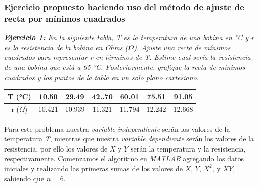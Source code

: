 \documentclass[11pt,letterpaper]{article}
\begin{document}
\subsubsection{Ejercicio propuesto haciendo uso del método de ajuste de recta por mínimos cuadrados}
\begin{center}
\textit{\textbf{Ejercicio 1: } En la siguiente tabla, T es la temperatura de una bobina en °C  y r es la resistencia de la bobina en Ohms ($\Omega$). Ajuste una recta de mínimos cuadrados para representar r en términos de T. Estime cual sería la resistencia de una bobina que está a 65 °C. Posteriormente, grafique la recta de mínimos cuadrados y los puntos de la tabla en un solo plano cartesiano}.\linebreak \par
\begin{tabular}{c|cccccc}
 \hline 
 T (°C) & 10.50 & 29.49 & 42..70 & 60.01 & 75.51 & 91.05 \\ 
 \hline 
 r ($\Omega$) & 10.421 & 10.939 & 11.321 & 11.794 & 12.242 & 12.668 \\ 
 \hline 
 \end{tabular} 
\end{center}
Para este problema nuestra \textit{variable independiente} serán los valores de la temperatura \textit{T}, mientras que nuestra \textit{variable dependiente} serán los valores de la resistencia, por ello los valores de $X$ y $Y$ serán la temperatura y la resistencia, respectivamente. Comenzamos el algoritmo en \textit{MATLAB} agregando los datos iniciales y realizando las primeras sumas de los valores de $X$, $Y$,  $X^2$, y $XY$, sabiendo que $n = 6$. 
\end{document}
